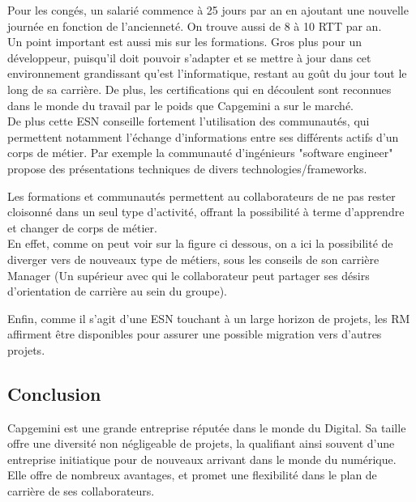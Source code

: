 \documentclass{rapport}
\begin{document}
Pour les congés, un salarié commence à 25 jours par an en ajoutant une nouvelle journée en fonction de l'ancienneté. On trouve aussi de 8 à 10 RTT par an.\\

Un point important est aussi mis sur les formations. Gros plus pour un développeur, puisqu'il doit pouvoir s'adapter et se mettre à jour dans cet environnement grandissant qu'est l'informatique, restant au goût du jour tout le long de sa carrière. De plus, les certifications qui en découlent sont reconnues dans le monde du travail par le poids que Capgemini a sur le marché.\\

De plus cette ESN conseille fortement l'utilisation des communautés, qui permettent notamment l'échange d'informations entre ses différents actifs d'un corps de métier. Par exemple la communauté d'ingénieurs "software engineer" propose des présentations techniques de divers technologies/frameworks.

Les formations et communautés permettent au collaborateurs de ne pas rester cloisonné dans un seul type d'activité, offrant la possibilité à terme d'apprendre et changer de corps de métier.\\

En effet, comme on peut voir sur la figure ci dessous, on a ici la possibilité de diverger vers de nouveaux type de métiers, sous les conseils de son carrière Manager (Un supérieur avec qui le collaborateur peut partager ses désirs d'orientation de carrière au sein du groupe).\\


Enfin, comme il s'agit d'une ESN touchant à un large horizon de projets, les RM affirment être disponibles pour assurer une possible migration vers d'autres projets. 

\subsection{Conclusion}

Capgemini est une grande entreprise réputée dans le monde du Digital. Sa taille offre une diversité non négligeable de projets, la qualifiant ainsi souvent d'une entreprise initiatique pour de nouveaux arrivant dans le monde du numérique.
Elle offre de nombreux avantages, et promet une flexibilité dans le plan de carrière de ses collaborateurs.
\end{document}
